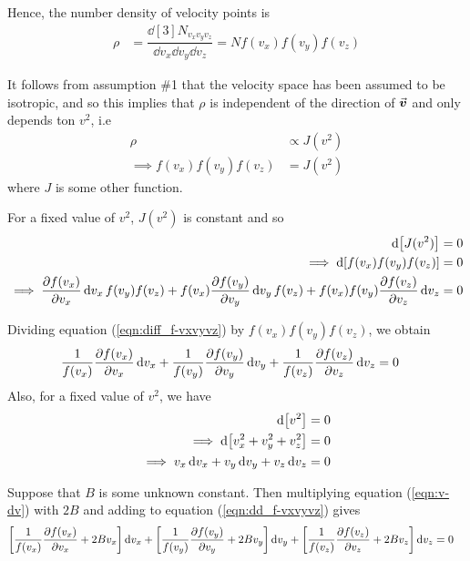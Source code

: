 		Hence, the number density of velocity points is
		\begin{align}
			\rho&=\dfrac{\dd[3]{N_{v_xv_yv_z}}}{\dd{v_x}\dd{v_y}\dd{v_z}}=Nf(v_x)f(v_y)f(v_z) \label{eqn:rho-01}
		\end{align}
		
		It follows from assumption \#1 that the velocity space has been assumed to be isotropic, and so this implies that $\rho$ is independent of the direction of $\va*{v}$ and only depends ton $v^2$, i.e
		\begin{align}
			\rho&\propto J(v^2) \nonumber\\
			\implies f(v_x)f(v_y)f(v_z)&=J(v^2) \label{eqn:J-f}
		\end{align}
		where $J$ is some other function.
		
		For a fixed value of $v^2$, $J(v^2)$ is constant and so
		\begin{align}
			\dd{\qty[J(v^2)]}&=0 \nonumber\\
			\implies\dd{\qty[f(v_x)f(v_y)f(v_z)]}&=0 \nonumber\\
			\implies\pdv{f(v_x)}{v_x}\dd{v_x}f(v_y)f(v_z)+f(v_x)\pdv{f(v_y)}{v_y}\dd{v_y}f(v_z)+f(v_x)f(v_y)\pdv{f(v_z)}{v_z}\dd{v_z}&=0 \label{eqn:diff_f-vxvyvz}
		\end{align}
		
		Dividing equation (\ref{eqn:diff_f-vxvyvz}) by $f(v_x)f(v_y)f(v_z)$, we obtain
		\begin{align}
			\dfrac{1}{f(v_x)}\pdv{f(v_x)}{v_x}\dd{v_x}+\dfrac{1}{f(v_y)}\pdv{f(v_y)}{v_y}\dd{v_y}+\dfrac{1}{f(v_z)}\pdv{f(v_z)}{v_z}\dd{v_z}&=0 \label{eqn:dd_f-vxvyvz}
		\end{align}
		Also, for a fixed value of $v^2$, we have
		\begin{align}
			\dd{\qty[v^2]}&=0 \nonumber\\
			\implies\dd{\qty[v_x^2+v_y^2+v_z^2]}&=0 \nonumber\\
			\implies v_x\dd{v_x}+v_y\dd{v_y}+v_z\dd{v_z}&=0 \label{eqn:v-dv}
		\end{align}
		
		Suppose that $B$ is some unknown constant. Then multiplying equation (\ref{eqn:v-dv}) with $2B$ and adding to equation (\ref{eqn:dd_f-vxvyvz}) gives
		\begin{align}
			\qty[\dfrac{1}{f(v_x)}\pdv{f(v_x)}{v_x}+2Bv_x]\dd{v_x} +  \qty[\dfrac{1}{f(v_y)}\pdv{f(v_y)}{v_y}+2Bv_y]\dd{v_y} +  \qty[\dfrac{1}{f(v_z)}\pdv{f(v_z)}{v_z}+2Bv_z]\dd{v_z} &= 0 \label{eqn:combo-10-11}
		\end{align}
		

